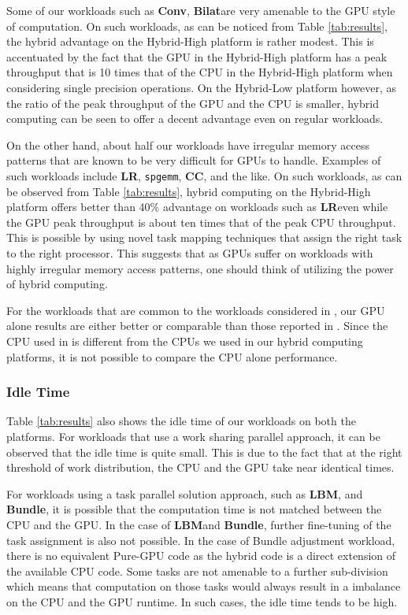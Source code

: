 \documentclass[11pt]{article}
\newcommand{\sgemm} {{\tt spgemm}}
\newcommand{\bilat} {{\bf Bilat}}
\newcommand{\conv} {{\bf Conv}}
\newcommand{\LR} {{\bf LR}}
\newcommand{\CC} {{\bf CC}}
\newcommand{\Bundle} {{\bf Bundle}}
\newcommand{\LBM} {{\bf LBM}}
\begin{document}
Some of our workloads such as  \conv, \bilat are
very amenable to the GPU style of computation. On such workloads, as can
be noticed from Table \ref{tab:results}, the hybrid advantage on the
Hybrid-High platform is rather modest. This is accentuated by the fact that
the GPU in the Hybrid-High platform has a peak throughput that is 10 times
that of the CPU in the Hybrid-High platform when considering single
precision operations.  On the Hybrid-Low
platform however, as the ratio of the peak throughput of the GPU and the
CPU is smaller, hybrid computing can be seen to offer a decent advantage
even on regular workloads.


On the other hand, about half our workloads have irregular memory access
patterns that are
known to be very difficult for GPUs to handle. Examples of such workloads
include \LR, \sgemm, \CC, and the like. 
On such workloads, as can be observed from Table \ref{tab:results}, hybrid
computing on the Hybrid-High platform offers better than 40\% advantage on 
workloads such as \LR even while the GPU peak throughput is 
about ten times that of the peak CPU throughput.
This is possible by using novel task mapping techniques
that assign the right task to the right processor. This suggests that as
GPUs suffer on workloads with highly irregular memory access patterns,
one should think of utilizing the power of hybrid computing. 

For the workloads that are common to the workloads considered in
\cite{isca10}, our GPU alone results are either better or comparable than
those reported in \cite{isca10}. Since the CPU used in \cite{isca10} is
different from the CPUs we used in our hybrid computing platforms, it is not
possible to compare the CPU alone performance. 

\subsubsection{Idle Time}
Table \ref{tab:results} also shows the idle time of our workloads on
both the platforms. For workloads that use a work sharing parallel
approach, it can be observed that the idle time is quite small. 
This is due to the fact that at the right threshold of work
distribution, the CPU and the GPU  take near identical times. 

For workloads using a task parallel solution approach, such as \LBM,
and \Bundle, it is possible that the computation time is not matched
between the CPU and the GPU. In the case of \LBM and \Bundle, further
fine-tuning of the task assignment is also not possible. In the
case of Bundle adjustment workload, there is no equivalent Pure-GPU code as
the hybrid code is a direct extension of the available CPU code.
 Some tasks are
not amenable to a further sub-division which means that computation on those
tasks would always result in a imbalance on the CPU and the GPU runtime.
In such cases, the idle time tends to be high. 
\end{document}
